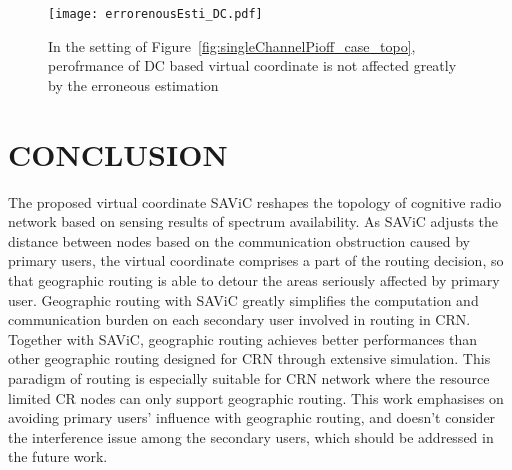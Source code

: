 \begin{figure}[ht]
	\centering
    \texttt{[image: errorenousEsti\_DC.pdf]}
    \caption{In the setting of Figure~\ref{fig:singleChannelPioff_case_topo}, perofrmance of DC based virtual coordinate is not affected greatly by the erroneous estimation} 			\label{fig:errorenousEsti_DC}
\end{figure}




\section{CONCLUSION}
The proposed virtual coordinate SAViC reshapes the topology of cognitive radio network based on sensing results of spectrum availability.
As SAViC adjusts the distance between nodes based on the communication obstruction caused by primary users, the virtual coordinate comprises a part of the routing decision, so that geographic routing is able to detour the areas seriously affected by primary user.
Geographic routing with SAViC greatly simplifies the computation and communication burden on each secondary user involved in routing in CRN.
Together with SAViC, geographic routing achieves better performances than other geographic routing designed for CRN through extensive simulation.
This paradigm of routing is especially suitable for CRN network where the resource limited CR nodes can only support geographic routing.
This work emphasises on avoiding primary users' influence with geographic routing, and doesn't consider the interference issue among the secondary users, which should be addressed in the future work.
%
